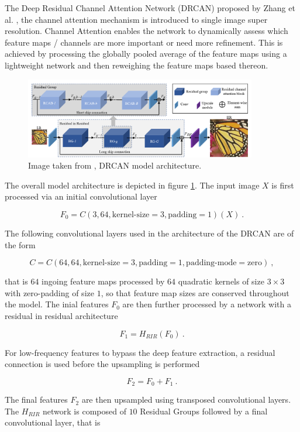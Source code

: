 The Deep Residual Channel Attention Network (DRCAN) proposed by Zhang et al. \cite{zhangImageSuperResolutionUsing2018}, 
the channel attention mechanism is introduced to single image super resolution.
Channel Attention enables the network to dynamically assess which feature maps / channels are more important or need more refinement.
This is achieved by processing the globally pooled average of the feature maps using a lightweight network
and then reweighing the feature maps based thereon.

\begin{figure}[h!]
    \includegraphics[width=0.9\textwidth]{models/sisr/imgs/drcan_model.png}
    \caption{Image taken from \cite{zhangImageSuperResolutionUsing2018}, DRCAN model architecture.}
    \label{fig:drcan_model}
\end{figure}

The overall model architecture is depicted in figure \ref{fig:drcan_model}.
The input image $X$ is first processed via an initial convolutional layer

    $$ F_0 = C(3, 64, \text{kernel-size}=3, \text{padding}=1)(X) ~. $$

The following convolutional layers used in the architecture of the DRCAN are of the form    

    $$ C = C(64, 64, \text{kernel-size}=3, \text{padding}=1, \text{padding-mode}=\text{zero}) ~, $$

that is $64$ ingoing feature maps processed by $64$ quadratic kernels of size $3 \times 3$ with zero-padding of size $1$, 
so that feature map sizes are conserved throughout the model.
The inial features $F_0$ are then further processed by a network with a residual in residual architecture

    $$ F_{1} = H_{RIR}(F_0) ~. $$

For low-frequency features to bypass the deep feature extraction, 
a residual connection is used before the upsampling is performed

    $$F_2 = F_0 + F_1 ~.$$

The final features $F_2$ are then upsampled using transposed convolutional layers. \newline
The $H_{RIR}$ network is composed of $10$ Residual Groups followed by a final convolutional layer, 
that is 

